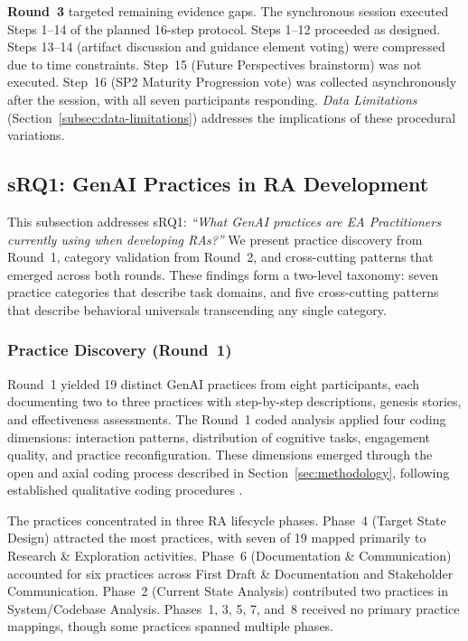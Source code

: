 \textbf{Round~3} targeted remaining evidence gaps. The synchronous session
executed Steps 1--14 of the planned 16-step protocol. Steps 1--12 proceeded as
designed. Steps 13--14 (artifact discussion and guidance element voting) were
compressed due to time constraints. Step~15 (Future Perspectives brainstorm) was
not executed. Step~16 (SP2 Maturity Progression vote) was collected
asynchronously after the session, with all seven participants responding.
\textit{Data Limitations} (Section~\ref{subsec:data-limitations}) addresses the implications of these
procedural variations.

\subsection{sRQ1: GenAI Practices in RA Development}\label{subsec:srq1}

This subsection addresses sRQ1: \textit{``What GenAI practices are EA
Practitioners currently using when developing RAs?''} We present practice
discovery from Round~1, category validation from Round~2, and cross-cutting
patterns that emerged across both rounds. These findings form a two-level
taxonomy: seven practice categories that describe task domains, and five
cross-cutting patterns that describe behavioral universals transcending any
single category.

\subsubsection{Practice Discovery (Round~1)}\label{subsubsec:practice-discovery}

Round~1 yielded 19 distinct GenAI practices from eight participants, each
documenting two to three practices with step-by-step descriptions, genesis
stories, and effectiveness assessments. The Round~1 coded analysis applied four coding dimensions: interaction patterns,
distribution of cognitive tasks, engagement quality, and practice reconfiguration.
These dimensions emerged through the open and axial coding process described in
Section~\ref{sec:methodology}, following established qualitative coding procedures
\parencite{charmaz_constructing_2014, patton_qualitative_2015}.

The practices concentrated in three RA lifecycle phases. Phase~4 (Target State
Design) attracted the most practices, with seven of 19 mapped primarily to
Research \& Exploration activities. Phase~6 (Documentation \& Communication)
accounted for six practices across First Draft \& Documentation and Stakeholder
Communication. Phase~2 (Current State Analysis) contributed two practices in
System/Codebase Analysis. Phases~1, 3, 5, 7, and~8 received no primary practice
mappings, though some practices spanned multiple phases.

